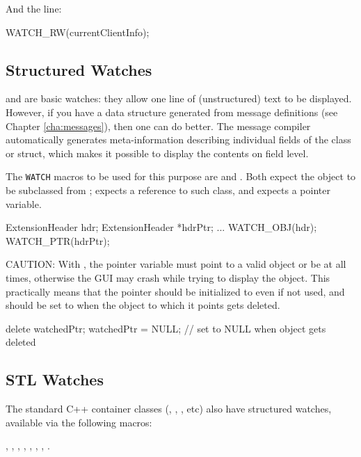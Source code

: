 And the  line:

\begin{cpp}
WATCH_RW(currentClientInfo);
\end{cpp}


\subsection{Structured Watches}

 and  are basic watches: they allow one
line of (unstructured) text to be displayed. However, if you have a
data structure generated from message definitions (see Chapter \ref{cha:messages}),
then one can do better. The message compiler automatically generates
meta-information describing individual fields of the class or struct,
which makes it possible to display the contents on field level.

The \texttt{WATCH} macros to be used for this purpose are 
and . Both expect the object to be subclassed from
;  expects a reference to such class,
and  expects a pointer variable.

\begin{cpp}
ExtensionHeader hdr;
ExtensionHeader *hdrPtr;
...
WATCH_OBJ(hdr);
WATCH_PTR(hdrPtr);
\end{cpp}

CAUTION: With , the pointer variable must point to a valid
object or be  at all times, otherwise the GUI may crash
while trying to display the object. This practically means that
the pointer should be initialized to  even if not used, and
should be set to  when the object to which it points gets deleted.

\begin{cpp}
delete watchedPtr;
watchedPtr = NULL;  // set to NULL when object gets deleted
\end{cpp}


\subsection{STL Watches}

The standard C++ container classes (, , , etc)
also have structured watches, available via the following macros:

, ,
, ,
, ,
, .

